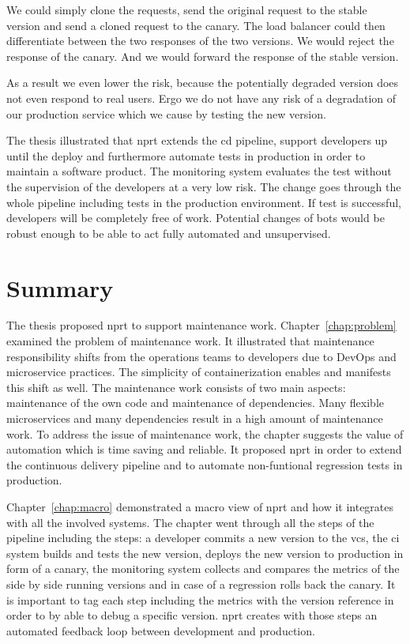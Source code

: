 We could simply clone the requests, send the original request to the stable version and
send a cloned request to the canary. The load balancer could then differentiate between the
two responses of the two versions. We would reject the response of the canary. And we
would forward the response of the stable version.

As a result we even lower the risk, because the potentially degraded version does not even
respond to real users. Ergo we do not have any risk of a degradation of our production
service which we cause by testing the new version.


The thesis illustrated that \gls{nprt} extends the \gls{cd} pipeline, support developers
up until the deploy and furthermore automate tests in production in order to maintain a
software product. The monitoring system evaluates the test without the supervision of the
developers at a very low risk. The change goes through the whole pipeline including tests
in the production environment. If test is successful, developers will be completely free
of work. Potential changes of bots would be robust enough to be able to act fully
automated and unsupervised.

\section{Summary}

The thesis proposed \gls{nprt} to support maintenance work. Chapter~\ref{chap:problem}
examined the problem of maintenance work. It illustrated that maintenance responsibility
shifts from the operations teams to developers due to DevOps and microservice
practices. The simplicity of containerization enables and manifests this shift as
well. The maintenance work consists of two main aspects: maintenance of the own code and
maintenance of dependencies. Many flexible microservices and many dependencies result in a
high amount of maintenance work. To address the issue of maintenance work, the chapter
suggests the value of automation which is time saving and reliable. It proposed \gls{nprt}
in order to extend the continuous delivery pipeline and to automate non-funtional
regression tests in production.

Chapter~\ref{chap:macro} demonstrated a macro view of \gls{nprt} and how it integrates
with all the involved systems. The chapter went through all the steps of the pipeline
including the steps: a developer commits a new version to the \gls{vcs}, the \gls{ci}
system builds and tests the new version, \deployer deploys the new version to production
in form of a canary, the monitoring system collects and compares the metrics of the side
by side running versions and in case of a regression \deployer rolls back the canary. It
is important to tag each step including the metrics with the version reference in order to
by able to debug a specific version. \gls{nprt} creates with those steps an automated
feedback loop between development and production.


